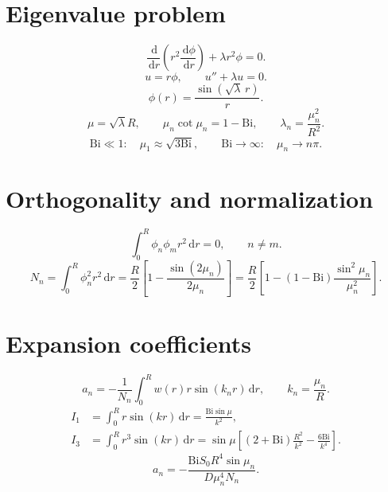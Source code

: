 \documentclass[11pt,a4paper]{article}
\newcommand{\Bi}{\mathrm{Bi}}
\newcommand{\dd}{\,\mathrm{d}}
\begin{document}
\section{Eigenvalue problem}
\begin{equation}
\frac{\dd}{\dd r}\left(r^2\frac{\dd\phi}{\dd r}\right)+\lambda r^2\phi=0.
\end{equation}
\begin{equation}
u=r\phi,\qquad u''+\lambda u=0.
\end{equation}
\begin{equation}
\phi(r)=\frac{\sin(\sqrt{\lambda}\,r)}{r}.
\end{equation}
\begin{equation}
\mu=\sqrt{\lambda}R,\qquad
\boxed{\mu_n\cot\mu_n=1-\Bi},\qquad
\boxed{\lambda_n=\frac{\mu_n^2}{R^2}}.
\end{equation}
\begin{equation}
\Bi\ll1:\quad \mu_1\approx\sqrt{3\Bi},
\qquad
\Bi\to\infty:\quad \mu_n\to n\pi.
\end{equation}

\section{Orthogonality and normalization}
\begin{equation}
\int_0^R\phi_n\phi_m r^2\dd r=0,\qquad n\ne m.
\end{equation}
\begin{equation}
N_n=\int_0^R\phi_n^2r^2\dd r
=\frac{R}{2}\left[1-\frac{\sin(2\mu_n)}{2\mu_n}\right]
=\frac{R}{2}\left[1-(1-\Bi)\frac{\sin^2\mu_n}{\mu_n^2}\right].
\end{equation}

\section{Expansion coefficients}
\begin{equation}
a_n=-\frac{1}{N_n}\int_0^Rw(r)r\sin(k_nr)\dd r,
\qquad k_n=\frac{\mu_n}{R}.
\end{equation}
\begin{align}
I_1&=\int_0^Rr\sin(kr)\dd r
=\frac{\Bi\sin\mu}{k^2},\\
I_3&=\int_0^Rr^3\sin(kr)\dd r
=\sin\mu\left[(2+\Bi)\frac{R^2}{k^2}-\frac{6\Bi}{k^4}\right].
\end{align}
\begin{equation}
\boxed{a_n=-\frac{\Bi S_0R^4\sin\mu_n}{D\mu_n^4N_n}}.
\end{equation}
\end{document}

